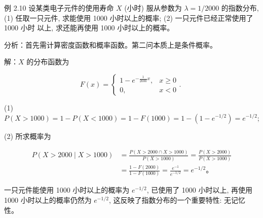 \documentclass{beamer}
\begin{document}
	\begin{frame}
		\begin{figure}
			\centering
		\end{figure}
	\end{frame}
	
	\begin{frame}
		例 2.10 设某类电子元件的使用寿命 $X$ (小时) 服从参数为 $\lambda=1 / 2000$ 的指数分布, (1) 任取一只元件, 求能使用 1000 小时以上的概率; (2) 一只元件已经正常使用了 1000 小时 以上, 求还能再使用 1000 小时以上的概率。
	\end{frame}
	
	\begin{frame}
		分析：首先需计算密度函数和概率函数。第二问本质上是条件概率。
		
		解：$X$ 的分布函数为
		
		$$
		F(x)=\left\{\begin{array}{ll}
			1-e^{-\frac{1}{2000} x}, & x \geqslant 0 \\
			0, & x<0
		\end{array}\right. \text {. }
		$$
		
		(1) $P(X>1000)=1-P(X<1000)=1-F(1000)=1-\left(1-e^{-1 / 2}\right)=e^{-1 / 2}$;
		
		(2) 所求概率为
		
		$$
		\begin{aligned}
			P(X>2000 \mid X>1000) & =\frac{P(X>2000 \cap X>1000)}{P(X>1000)}=\frac{P(X>2000)}{P(X>1000)} \\
			& =\frac{1-F(2000)}{1-F(1000)}=\frac{e^{-1}}{e^{-1 / 2}}=e^{-1 / 2} 。
		\end{aligned}
		$$
		
		一只元件能使用 1000 小时以上的概率为 $e^{-1 / 2}$, 已使用了 1000 小时以上, 再使用 1000 小时以上的概率仍然为 $e^{-1 / 2}$, 这反映了指数分布的一个重要特性: 无记忆性。
	\end{frame} 
	
\end{document}
